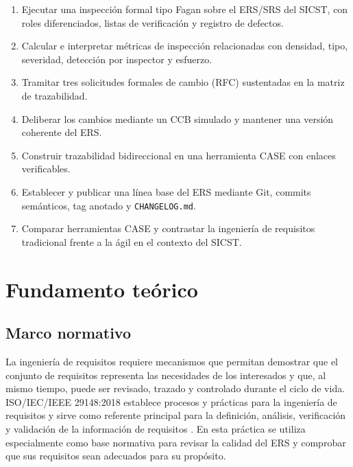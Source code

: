 \documentclass[12pt,a4paper]{article}
\newcommand{\Sigla}{SICST}
\begin{document}
\begin{enumerate}[label=\arabic*.,leftmargin=1.1cm]
    \item Ejecutar una inspección formal tipo Fagan sobre el ERS/SRS del \Sigla{}, con roles diferenciados, listas de verificación y registro de defectos.
    \item Calcular e interpretar métricas de inspección relacionadas con densidad, tipo, severidad, detección por inspector y esfuerzo.
    \item Tramitar tres solicitudes formales de cambio (RFC) sustentadas en la matriz de trazabilidad.
    \item Deliberar los cambios mediante un CCB simulado y mantener una versión coherente del ERS.
    \item Construir trazabilidad bidireccional en una herramienta CASE con enlaces verificables.
    \item Establecer y publicar una línea base del ERS mediante Git, commits semánticos, tag anotado y \texttt{CHANGELOG.md}.
    \item Comparar herramientas CASE y contrastar la ingeniería de requisitos tradicional frente a la ágil en el contexto del \Sigla{}.
\end{enumerate}


\section{Fundamento teórico}

\subsection{Marco normativo}

La ingeniería de requisitos requiere mecanismos que permitan demostrar que el conjunto de requisitos representa las necesidades de los interesados y que, al mismo tiempo, puede ser revisado, trazado y controlado durante el ciclo de vida. ISO/IEC/IEEE 29148:2018 establece procesos y prácticas para la ingeniería de requisitos y sirve como referente principal para la definición, análisis, verificación y validación de la información de requisitos \cite{r1}. En esta práctica se utiliza especialmente como base normativa para revisar la calidad del ERS y comprobar que sus requisitos sean adecuados para su propósito.
\end{document}
